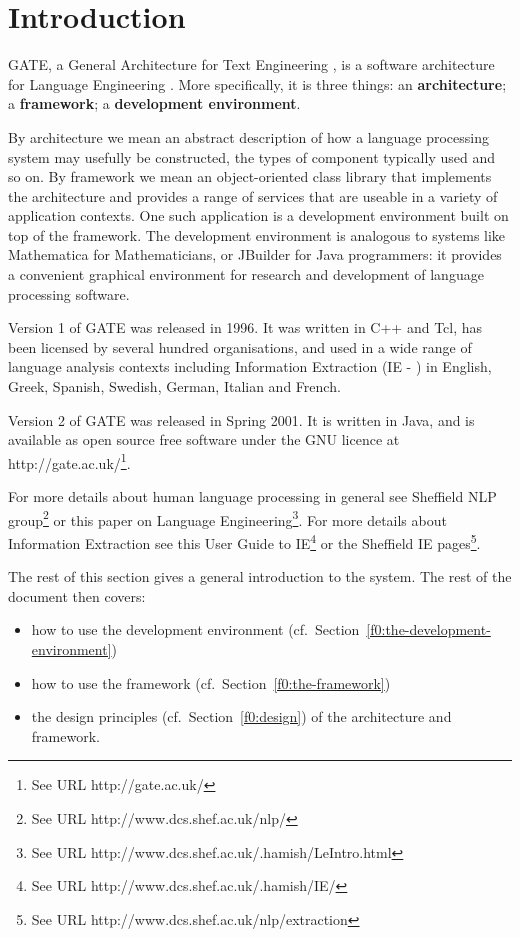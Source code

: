 
\section{Introduction}

\label{f0}
GATE, a General Architecture for Text Engineering
\cite{Cun96b,Cun97a,Cun98,Cun99a,Cun00a,Cun01b},
is a software architecture for Language Engineering \cite{Cun99b}.
More specifically, it is three things: an {\bf architecture}; 
a {\bf framework}; a {\bf development environment}.

By architecture we mean an abstract description of how a language processing
system may usefully be constructed, the types of component typically
used and so on.
By framework we mean an object-oriented class library that implements the
architecture and provides a range of services that are useable in a variety
of application contexts. One such application is a development environment
built on top of the framework. The development environment is analogous to
systems like Mathematica for Mathematicians, or JBuilder for Java
programmers: it provides a convenient graphical environment for research and
development of language processing software.

Version 1 of GATE was released in 1996. It was written in C++ and Tcl, has
been licensed by several hundred organisations, and used in a wide range of
language analysis contexts including Information Extraction (IE -
\cite{Gai98a,Cun99c}) in English, Greek, Spanish, Swedish, German, Italian and
French.

Version 2 of GATE was released in Spring 2001. It is written in Java,
and is available as open source free software under the GNU licence
at http://gate.ac.uk/\footnote{See URL http://gate.ac.uk/}.

For more details about human language processing in general see
Sheffield NLP group\footnote{See URL http://www.dcs.shef.ac.uk/nlp/}
or this paper on
Language
Engineering\footnote{See URL http://www.dcs.shef.ac.uk/.hamish/LeIntro.html}.
For more details about Information Extraction see this
User Guide to IE\footnote{See URL http://www.dcs.shef.ac.uk/.hamish/IE/}
or the Sheffield
IE pages\footnote{See URL http://www.dcs.shef.ac.uk/nlp/extraction}.

The rest of this section gives a general introduction to the system.
The rest of the document then covers:
\begin{itemize}
\item 
how to use the
development environment (cf.\ Section~\ref{f0:the-development-environment})
\item 
how to use the framework (cf.\ Section~\ref{f0:the-framework})
\item 
the design principles (cf.\ Section~\ref{f0:design}) of the architecture and framework.
\end{itemize}

